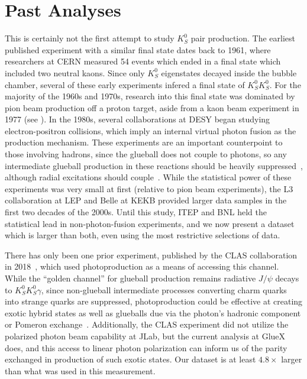 \section{Past Analyses}
This is certainly not the first attempt to study $K_S^0$ pair production. The earliest published experiment with a similar final state dates back to 1961, where researchers at CERN measured 54 events which ended in a final state which included two neutral kaons. Since only $K_S^0$ eigenstates decayed inside the bubble chamber, several of these early experiments infered a final state of $K_S^0K_S^0$. For the majority of the 1960s and 1970s, research into this final state was dominated by pion beam production off a proton target, aside from a kaon beam experiment in 1977 (see ). In the 1980s, several collaborations at DESY began studying electron-positron collisions, which imply an internal virtual photon fusion as the production mechanism. These experiments are an important counterpoint to those involving hadrons, since the glueball does not couple to photons, so any intermediate glueball production in these reactions should be heavily suppressed~\cite{acciarri_k0sk0s_2001}, although radial excitations should couple~\cite{mathieu_physics_2009}. While the statistical power of these experiments was very small at first (relative to pion beam experiments), the L3 collaboration at LEP and Belle at KEKB provided larger data samples in the first two decades of the 2000s. Until this study, ITEP and BNL held the statistical lead in non-photon-fusion experiments, and we now present a dataset which is larger than both, even using the most restrictive selections of data.

There has only been one prior experiment, published by the CLAS collaboration in 2018~\cite{the_clas_collaboration_double_2018}, which used photoproduction as a means of accessing this channel. While the ``golden channel'' for glueball production remains radiative $J/\psi$ decays to $K_S^0K_S^0\gamma$, since non-glueball intermediate processes converting charm quarks into strange quarks are suppressed, photoproduction could be effective at creating exotic hybrid states as well as glueballs due via the photon's hadronic component or Pomeron exchange~\cite{mathieu_physics_2009}. Additionally, the CLAS experiment did not utilize the polarized photon beam capability at JLab, but the current analysis at GlueX does, and this access to linear photon polarization can inform us of the parity exchanged in production of such exotic states. Our dataset is at least $4.8\times$ larger than what was used in this measurement.

